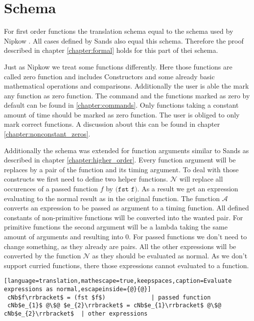 
\section{Schema} \label{chapter:impl_schema}

For first order functions the translation schema equal to the schema used by Nipkow \parencite{fds}.
All cases defined by Sands also equal this schema.
Therefore the proof described in chapter \ref{chapter:formal} holds for this part of thei schema.

Just as Nipkow we treat some functions differently.
Here those functions are called zero function and includes Constructors and some already basic mathematical operations and comparisons.
Additionally the user is able the mark any function as zero function.
The command and the functions marked as zero by default can be found in \ref{chapter:commands}.
Only functions taking a constant amount of time should be marked as zero function.
The user is obliged to only mark correct functions.
A discussion about this can be found in chapter \ref{chapter:nonconstant_zeros}.

Additionally the schema was extended for function arguments similar to Sands as described in chapter \ref{chapter:higher_order}.
Every function argument will be replaces by a pair of the function and its timing argument.
To deal with those constructs we first need to define two helper functions.
$\mathcal{N}$ will replace all occurences of a passed function $f$ by $\texttt{(fst f)}$.
As a result we get an expression evaluating to the normal result as in the original function.
The function $\mathcal{A}$ converts an expression to be passed as argument to a timing function.
All defined constants of non-primitive functions will be converted into the wanted pair.
For primitive functions the second argument will be a lambda taking the same amount of arguments and resulting into $0$.
For passed functions we don't need to change something, as they already are pairs.
All the other expressions will be converted by the function $\mathcal{N}$ as they should be evaluated as normal.
As we don't support curried functions, there those expressions cannot evaluated to a function.
\begin{lstlisting}[language=translation,mathescape=true,keepspaces,caption=Evaluate expressions as normal,escapeinside={@}{@}]
 cNb$f\rrbracket$ = (fst $f$)             | passed function
 cNb$e_{1}$ @\$@ $e_{2}\rrbracket$ = cNb$e_{1}\rrbracket$ @\$@ cNb$e_{2}\rrbracket$  | other expressions
\end{lstlisting}

